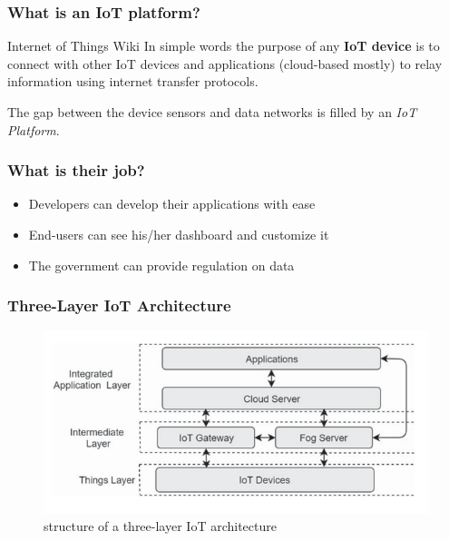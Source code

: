 \documentclass{../iot-lecture}
\begin{document}
\begin{frame}
  \frametitle{What is an IoT platform?}
  \begin{block}{Internet of Things Wiki}
    In simple words the purpose of any \textbf{\color{YellowOrange} IoT device} is to connect with
    other IoT devices and applications (cloud-based mostly) to relay
    information using internet transfer protocols.

    The gap between the device sensors and data networks is filled
    by an \textit{\color{Green} IoT Platform}.
  \end{block}
\end{frame}

\begin{frame}
  \frametitle{What is their job?}
  \begin{itemize}
    \item Developers can develop their applications with ease
    \item End-users can see his/her dashboard and customize it
    \item The government can provide regulation on data
  \end{itemize}
\end{frame}

\begin{frame}
  \frametitle{Three-Layer IoT Architecture}
  \begin{figure}
    \centering
    \includegraphics[width=\textwidth]{./img/three-layer-iot-architecture.png}
    \caption{structure of a three-layer IoT architecture}
  \end{figure}
\end{frame}
\end{document}
